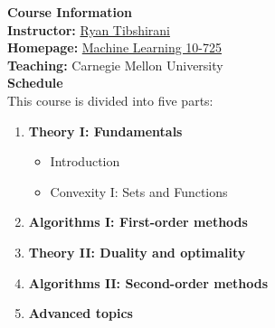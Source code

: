 \documentclass[a4paper]{article}
\def\nlecturer {Ryan Tibshirani}
\begin{document}
\maketitle
{\small
\noindent\textbf{Course Information}\\ 
\indent \textbf{Instructor:} \textcolor{blue}{\href{https://www.stat.berkeley.edu/~ryantibs/index.html}{\nlecturer}} \\
\indent\textbf{Homepage:} \textcolor{blue}{\href{https://www.stat.cmu.edu/~ryantibs/convexopt/}{Machine Learning 10-725}} \\
\indent\textbf{Teaching:} Carnegie Mellon University \\

\vspace{10pt}
\noindent\textbf{Schedule}\\
\indent This course is divided into five parts: 
\begin{enumerate}
    \item \textbf{Theory I: Fundamentals}
    \begin{itemize}
        \item Introduction
        \item Convexity I: Sets and Functions
    \end{itemize}
    \item \textbf{Algorithms I: First-order methods}
    \item \textbf{Theory II: Duality and optimality}
    \item \textbf{Algorithms II: Second-order methods}
    \item \textbf{Advanced topics}
\end{enumerate}

\tableofcontents




}
\end{document}
